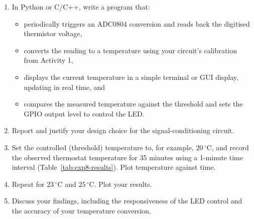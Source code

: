 \begin{procedure}
  \begin{enumerate}
    \item In Python or C/C++, write a program that:
          \begin{itemize}
            \item periodically triggers an ADC0804 conversion and reads back the digitised thermistor voltage,
            \item converts the reading to a temperature using your circuit's calibration from Activity 1,
            \item displays the current temperature in a simple terminal or GUI display, updating in real time, and
            \item compares the measured temperature against the threshold and sets the GPIO output level to control the LED.
          \end{itemize}
    \item Report and justify your design choice for the signal-conditioning circuit.
    \item Set the controlled (threshold) temperature to, for example, $20\,^{\circ}\text{C}$, and record the observed thermostat temperature for 35 minutes using a 1-minute time interval (Table~\ref{tab:exp8-results}). Plot temperature against time.
    \item Repeat for $23\,^{\circ}\text{C}$ and $25\,^{\circ}\text{C}$. Plot your results.
    \item Discuss your findings, including the responsiveness of the LED control and the accuracy of your temperature conversion.
  \end{enumerate}


\end{procedure}
